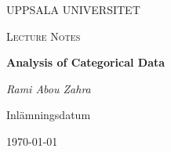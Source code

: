 \begin{titlepage}

  \centering
	{\scshape\LARGE UPPSALA UNIVERSITET\par}
	\vspace{1cm}
  {\scshape\Large {Lecture Notes} \par}
	\vspace{1.5cm}
  {\huge\bfseries {Analysis of Categorical Data} \par}
	\vspace{2cm}
	{\Large\itshape Rami Abou Zahra \par}
	\vfill
  \vfill


  {\large Inlämningsdatum}\par
  {\today}

\end{titlepage}
